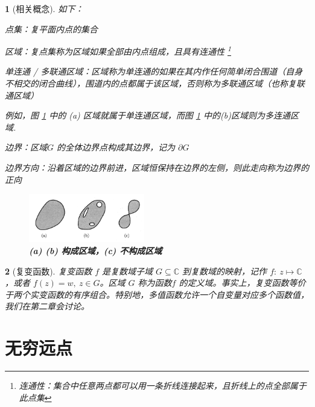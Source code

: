 \documentclass[UTF8]{report}
\def\C{\mathbb{C}}
\def\p{\partial}
\theoremstyle{MyLineTheoremStyle} %
\theoremstyle{MyBlockTheoremStyle} %
\theoremstyle{MySubsubsectionStyle} %
\newtheorem{definition}{}
\begin{document}
\begin{definition}[相关概念]
如下：
\begin{circledenum}
\item 点集：复平面内点的集合
\item 区域：复点集称为区域如果全部由内点组成，且具有连通性 
\footnote{连通性：集合中任意两点都可以用一条折线连接起来，且折线上的点全部属于此点集}
\item 单连通 / 多联通区域：区域称为单连通的如果在其内作任何简单闭合围道（自身不相交的闭合曲线），围道内的点都属于该区域，否则称为多联通区域（也称复联通区域）
{\par\color{gray}\small
例如，图 \ref{(a) (b) 构成区域，(c) 不构成区域} 中的 (a) 区域就属于单连通区域，而图 \ref{(a) (b) 构成区域，(c) 不构成区域} 中的(b)区域则为多连通区域.
\par}
\item 边界：区域$G$ 的全体边界点构成其边界，记为 $\p G$
\item 边界方向：沿着区域的边界前进，区域恒保持在边界的左侧，则此走向称为边界的正向 
\end{circledenum}

\begin{figure}[H]\centering
\includegraphics[width=0.45\textwidth]{assets/4d651e08624250e2b6a287f557fe1cf8.png}
\caption{\textbf{(a) (b) 构成区域，(c) 不构成区域}}\label{(a) (b) 构成区域，(c) 不构成区域}
\end{figure}
\end{definition}


\begin{definition}[复变函数]
复变函数 $f$ 是复数域子域 $G \subseteq \C$ 到复数域的映射，记作 $f:\ z \longmapsto \C$，或者 $f(z) = w,\ z \in G$。区域 $G$ 称为函数$f$  的定义域。事实上，复变函数等价于两个实变函数的有序组合。特别地，多值函数允许一个自变量对应多个函数值，我们在第二章会讨论。

\end{definition}

\section{无穷远点}
\end{document}
